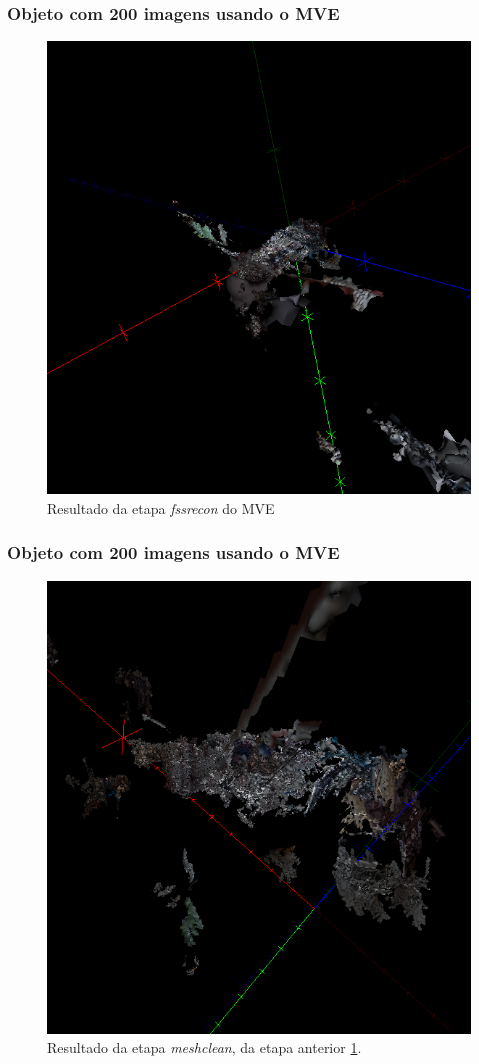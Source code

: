 \documentclass[table, usenames, svgnames, xcolor=dvipsnames]{beamer}
\begin{document}
\begin{frame}
\frametitle{\textbf{Objeto com 200 imagens usando o MVE}}
	\begin{figure}[!h]
		\centering
		\includegraphics[width=0.5\linewidth]{figs/galinhadmr.png}
		\caption{%
		Resultado da etapa \emph{fssrecon} do MVE
		}\label{fig:galinhaFssr}
	\end{figure}
\end{frame}

\begin{frame}
\frametitle{\textbf{Objeto com 200 imagens usando o MVE}}
	\begin{figure}[!h]
		\centering
		\includegraphics[width=0.5\linewidth]{figs/galinhameshclean.png}
		\caption{%
		Resultado da etapa \emph{meshclean}, da etapa anterior \ref{fig:galinhaFssr}.
		}\label{fig:galinhaMeshClean}
	\end{figure}
\end{frame}
\end{document}
